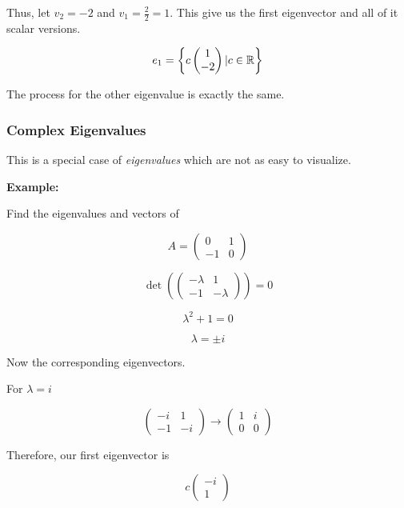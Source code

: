Thus, let \(v_2 = -2\) and \(v_1 = \frac{2}{2} = 1\). This give us the first eigenvector and all of it 
scalar versions.

\[
    e_1 = \left\{ c \begin{pmatrix} 1 \\ -2 \end{pmatrix} | c \in \mathbb{R}\right\}
\]

The process for the other eigenvalue is exactly the same.

\subsubsection{Complex Eigenvalues}

This is a special case of \emph{eigenvalues} which are not as easy to visualize.
\vspace{\baselineskip}

\textbf{Example:}

Find the eigenvalues and vectors of

\[
    A = \begin{pmatrix}
        0 & 1 \\
        -1 & 0 
    \end{pmatrix}
\]

\[
    \det\left( 
    \begin{pmatrix}
        -\lambda & 1 \\
        -1 & -\lambda
    \end{pmatrix}
    \right) = 0
\]

\[
    \lambda^2 + 1 = 0 
\]

\[
    \lambda = \pm i
\]

Now the corresponding eigenvectors.
\vspace{\baselineskip}

For \(\lambda = i\)

\[     
    \begin{pmatrix}
        -i & 1 \\
        -1 & -i
    \end{pmatrix}
    \rightarrow
    \begin{pmatrix}
        1 & i \\
        0 & 0
    \end{pmatrix} 
\]

Therefore, our first eigenvector is 

\[  
    c
    \begin{pmatrix}
        -i \\
        1        
    \end{pmatrix}
\]


